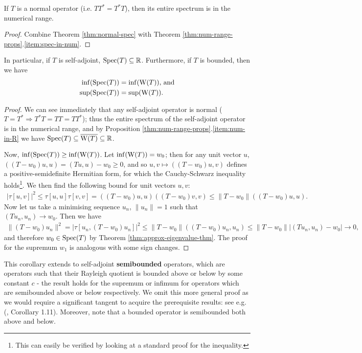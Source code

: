 \documentclass[../main.tex]{subfiles}
\begin{document}
\begin{corollary}\label{thm:normal-spec-in-num}
If $T$ is a normal operator (i.e. $TT^* = T^*T$), then its entire spectrum is in the numerical range.
\end{corollary}
\begin{proof}
Combine Theorem \ref{thm:normal-spec} with Theorem \ref{thm:num-range-props}.\ref{item:spec-in-num}.
\end{proof}

\begin{corollary}\label{thm:self-adj-num-range}
In particular, if $T$ is self-adjoint, $\mathrm{Spec}(T) \subseteq \mathbb{R}$. Furthermore, if $T$ is bounded, then we have
\begin{align*}
\inf(\mathrm{Spec}(T)) & = \inf(\mathrm{W}(T))\text{, and}\\
\sup(\mathrm{Spec}(T)) & = \sup(\mathrm{W}(T)).
\end{align*}
\end{corollary}
\begin{proof}
We can see immediately that any self-adjoint operator is normal ($T = T^* \Rightarrow T^*T = TT = TT^*$); thus the entire spectrum of the self-adjoint
operator is in the numerical range, and by Proposition \ref{thm:num-range-props}.\ref{item:num-in-R} we have $\mathrm{Spec}(T) \subseteq \overline{\mathrm{W}(T)} \subseteq \mathbb{R}$.

Now, $\inf(\mathrm{Spec}(T)) \geq \inf(\mathrm{W}(T))$. Let $\inf(\mathrm{W}(T)) = w_0$; then for any unit vector $u$, $((T - w_0)u, u)  = (Tu, u) - w_0 \geq 0$, and so $u, v \mapsto ((T - w_0)u, v)$ defines a positive-semidefinite Hermitian form, for which the Cauchy-Schwarz inequality holds\footnote{This can easily be verified by looking at a standard proof for the inequality.}. We then find the following bound for unit vectors $u, v$:
\begin{align*}
|\tau[u,v]|^2 \leq \tau[u, u] \tau[v, v] = ((T - w_0)u, u)((T - w_0)v, v) \leq \|T - w_0\|((T - w_0)u, u).
\end{align*}
Now let us take a minimising sequence $u_n$, $\|u_n\| = 1$ such that $(Tu_n, u_n) \rightarrow w_0$. Then we have
\begin{align*}
\|(T - w_0)u_n\|^2 = |\tau[u_n, (T - w_0)u_n]|^2  \leq \|T - w_0\|((T - w_0)u_n, u_n) \leq \|T - w_0\||(Tu_n, u_n) - w_0| \rightarrow 0,
\end{align*}
and therefore $w_0 \in \mathrm{Spec}(T)$ by Theorem \ref{thm:approx-eigenvalue-thm}.
The proof for the supremum $w_1$ is analogous with some sign changes.
\end{proof}
This corollary extends to self-adjoint \textbf{semibounded} operators, which are operators such that their Rayleigh quotient is bounded above or below by some constant $c$ - the result holds for the supremum or infimum for operators which are semibounded above or below respectively. We omit this more general proof as we would require a significant tangent to acquire the prerequisite results: see e.g. (\cite{frank2022schrodinger}, Corollary 1.11). Moreover, note that a bounded operator is semibounded both above and below.
\end{document}
